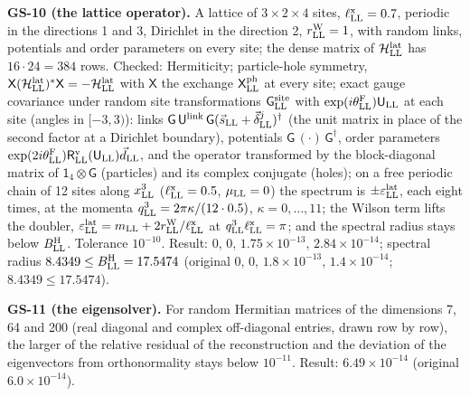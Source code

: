 \documentclass[
  10pt,
]{article}
\begin{document}
\textbf{GS-10 (the lattice operator).} A lattice of \(3\times2\times4\)
sites, \(\ell^{\rm x}_{\rm LL}=0.7\), periodic in the directions 1 and
3, Dirichlet in the direction 2, \(r^{\rm W}_{\rm LL}=1\), with random
links, potentials and order parameters on every site; the dense matrix
of \(\mathcal H^{\rm lat}_{\rm LL}\) has \(16\cdot24=384\) rows.
Checked: Hermiticity; particle-hole symmetry,
\(\mathsf X(\mathcal H^{\rm lat}_{\rm LL})^*\mathsf X=-\mathcal H^{\rm lat}_{\rm LL}\)
with \(\mathsf X\) the exchange \(\mathsf X^{\rm ph}_{\rm LL}\) at every
site; exact gauge covariance under random site transformations
\(\mathsf G^{\rm site}_{\rm LL}\) with
\(\exp(i\theta^{\rm F}_{\rm LL})\mathsf U_{\rm LL}\) at each site
(angles in \([-3,3)\)): links
\(\mathsf G\,\mathsf U^{\rm link}\,\mathsf G(\vec s_{\rm LL}+\vec\delta^j_{\rm LL})^\dagger\)
(the unit matrix in place of the second factor at a Dirichlet boundary),
potentials \(\mathsf G\,(\cdot)\,\mathsf G^\dagger\), order parameters
\(\exp(2i\theta^{\rm F}_{\rm LL})\mathsf R^{\rm v}_{\rm LL}(\mathsf U_{\rm LL})\vec d_{\rm LL}\),
and the operator transformed by the block-diagonal matrix of
\(\mathsf 1_4\otimes\mathsf G\) (particles) and its complex conjugate
(holes); on a free periodic chain of 12 sites along \(x^3_{\rm LL}\)
(\(\ell^{\rm x}_{\rm LL}=0.5\), \(\mu_{\rm LL}=0\)) the spectrum is
\(\pm\varepsilon^{\rm lat}_{\rm LL}\), each eight times, at the momenta
\(q^3_{\rm LL}=2\pi\kappa/(12\cdot0.5)\), \(\kappa=0,\dots,11\); the
Wilson term lifts the doubler,
\(\varepsilon^{\rm lat}_{\rm LL}=m_{\rm LL}+2r^{\rm W}_{\rm LL}/\ell^{\rm x}_{\rm LL}\)
at \(q^3_{\rm LL}\ell^{\rm x}_{\rm LL}=\pi\); and the spectral radius
stays below \(B^{\rm H}_{\rm LL}\). Tolerance \(10^{-10}\). Result: 0,
0, \(1.75\times10^{-13}\), \(2.84\times10^{-14}\); spectral radius
\(8.4349\le B^{\rm H}_{\rm LL}=17.5474\) (original 0, 0,
\(1.8\times10^{-13}\), \(1.4\times10^{-14}\); \(8.4349\le17.5474\)).

\textbf{GS-11 (the eigensolver).} For random Hermitian matrices of the
dimensions 7, 64 and 200 (real diagonal and complex off-diagonal
entries, drawn row by row), the larger of the relative residual of the
reconstruction and the deviation of the eigenvectors from orthonormality
stays below \(10^{-11}\). Result: \(6.49\times10^{-14}\) (original
\(6.0\times10^{-14}\)).
\end{document}
